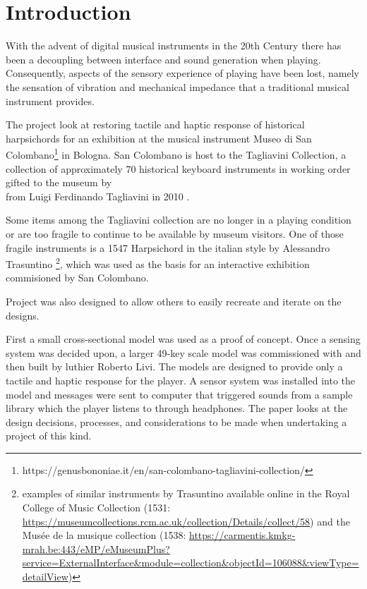 \section{Introduction}\label{introduction}

With the advent of digital musical instruments in the 20th Century there
has been a decoupling between interface and sound generation when
playing. Consequently, aspects of the sensory experience of playing have
been lost, namely the sensation of vibration and mechanical impedance
that a traditional musical instrument provides.

The project look at restoring tactile and haptic response of historical
harpsichords for an exhibition at the musical instrument Museo di San
Colombano\footnote{https://genusbononiae.it/en/san-colombano-tagliavini-collection/}
in Bologna. San Colombano is host to the Tagliavini Collection, a
collection of approximately 70 historical keyboard instruments in
working order \cite{Tagliavini2007} gifted to the museum by\\
from Luigi Ferdinando Tagliavini in 2010
\cite{SanColombano2010,Carlino2010}.

Some items among the Tagliavini collection are no longer in a playing
condition or are too fragile to continue to be available by museum
visitors. One of those fragile instruments is a 1547 Harpsichord in the
italian style by Alessandro Trasuntino
\cite{Wraight2024}\footnote{examples of similar instruments by
Trasuntino available online in the Royal College of Music Collection
(1531: \url{https://museumcollections.rcm.ac.uk/collection/Details/collect/58}) and
the Musée de la musique collection
(1538: \url{https://carmentis.kmkg-mrah.be:443/eMP/eMuseumPlus?service=ExternalInterface&module=collection&objectId=106088&viewType=detailView})
}, which was used as the basis for an interactive exhibition commisioned
by San Colombano.

Project was also designed to allow others to easily recreate and iterate
on the designs.

First a small cross-sectional model was used as a proof of concept. Once
a sensing system was decided upon, a larger 49-key scale model was
commissioned with and then built by luthier Roberto Livi. The models are
designed to provide only a tactile and haptic response for the player. A
sensor system was installed into the model and messages were sent to
computer that triggered sounds from a sample library which the player
listens to through headphones. The paper looks at the design decisions,
processes, and considerations to be made when undertaking a project of
this kind.

